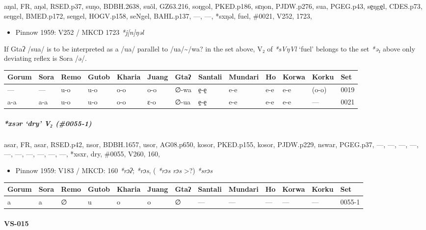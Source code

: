 \documentclass[a4paper,]{article}
\providecommand{\tightlist}{%
  \setlength{\itemsep}{0pt}\setlength{\parskip}{0pt}}
\let\oldparagraph\paragraph
\renewcommand{\paragraph}[1]{\oldparagraph{#1}\mbox{}}
\let\oldsubparagraph\subparagraph
\renewcommand{\subparagraph}[1]{\oldsubparagraph{#1}\mbox{}}
\begin{document}
aŋal, FR, aŋəl, RSED.p37, suŋo, BDBH.2638, suõl, GZ63.216, soŋgol,
PKED.p186, sɛŋon, PJDW.p276, sua, PGEG.p43, se̠ŋge̠l, CDES.p73, seŋgel,
BMED.p172, seŋgel, HOGV.p158, seNgel, BAHL.p137, ---, ---, *sxŋəl, fuel,
\#0021, V252, 1723,

\begin{itemize}
\tightlist
\item
  Pinnow 1959: V252 / MKCD 1723 \emph{*j{[}n{]}ŋəl}
\end{itemize}

If Gtaʔ /sua/ is to be interpreted as a /ua/ parallel to
/ua/\textasciitilde{}/wa? in the set above, V₂ of \emph{*sVŋVl} `fuel'
belongs to the set \emph{*ə₁} above only deviating reflex is Sora /ə/.

\begin{longtable}[]{@{}lllllllllllll@{}}
\toprule
Gorum & Sora & Remo & Gutob & Kharia & Juang & Gtaʔ & Santali & Mundari
& Ho & Korwa & Korku & Set\tabularnewline
\midrule
\endhead
--- & --- & u-o & u-o & o-o & o-o & ∅-wa & e̠-e̠ & e-e & e-e & e-e & (o-o)
& 0019\tabularnewline
a-a & a-a & u-o & u-o & o-o & ɛ-o & ∅-ua & e̠-e̠ & e-e & e-e & e-e & --- &
0021\tabularnewline
\bottomrule
\end{longtable}

\subparagraph{\texorpdfstring{\emph{*xsər} `dry' V₂
(\#0055-1)}{*xsər dry V₂ (\#0055-1)}}\label{xsux259r-dry-v-0055-1}

asar, FR, asar, RSED.p42, nsor, BDBH.1657, usor, AG08.p650, kosor,
PKED.p155, kosor, PJDW.p229, nswar, PGEG.p37, ---, ---, ---, ---, ---,
---, ---, ---, ---, ---, *xsxr, dry, \#0055, V260, 160,

\begin{itemize}
\tightlist
\item
  Pinnow 1959: V183 / MKCD: 160 \emph{*rɔʔ}; \emph{*rɔs}, ( \emph{*rɔs
  rɔs} \textgreater{}?) \emph{*srɔs}
\end{itemize}

\begin{longtable}[]{@{}lllllllllllll@{}}
\toprule
Gorum & Sora & Remo & Gutob & Kharia & Juang & Gtaʔ & Santali & Mundari
& Ho & Korwa & Korku & Set\tabularnewline
\midrule
\endhead
a & a & ∅ & u & o & o & ∅ & --- & --- & --- & --- & --- &
0055-1\tabularnewline
\bottomrule
\end{longtable}

\paragraph{VS-015}\label{vs-015}
\end{document}
